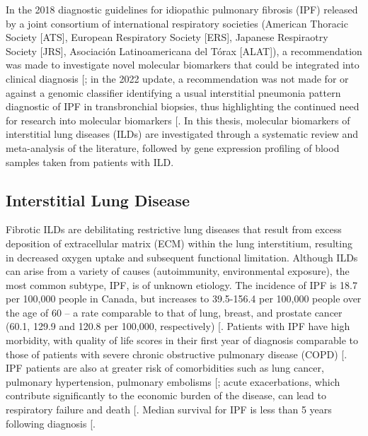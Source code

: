 \documentclass[
]{article}
\begin{document}
In the 2018 diagnostic guidelines for idiopathic pulmonary fibrosis (IPF) released by a joint consortium of international respiratory societies (American Thoracic Society {[}ATS{]}, European Respiratory Society {[}ERS{]}, Japanese Respiraotry Society {[}JRS{]}, Asociación Latinoamericana del Tórax {[}ALAT{]}), a recommendation was made to investigate novel molecular biomarkers that could be integrated into clinical diagnosis {[}\citeproc{ref-raghu_diagnosis_2018}{1}{]}; in the 2022 update, a recommendation was not made for or against a genomic classifier identifying a usual interstitial pneumonia pattern diagnostic of IPF in transbronchial biopsies, thus highlighting the continued need for research into molecular biomarkers {[}\citeproc{ref-raghu_idiopathic_2022}{2}{]}. In this thesis, molecular biomarkers of interstitial lung diseases (ILDs) are investigated through a systematic review and meta-analysis of the literature, followed by gene expression profiling of blood samples taken from patients with ILD.

\subsection{Interstitial Lung Disease}\label{interstitial-lung-disease}

Fibrotic ILDs are debilitating restrictive lung diseases that result from excess deposition of extracellular matrix (ECM) within the lung interstitium, resulting in decreased oxygen uptake and subsequent functional limitation. Although ILDs can arise from a variety of causes (autoimmunity, environmental exposure), the most common subtype, IPF, is of unknown etiology. The incidence of IPF is 18.7 per 100,000 people in Canada, but increases to 39.5-156.4 per 100,000 people over the age of 60 -- a rate comparable to that of lung, breast, and prostate cancer (60.1, 129.9 and 120.8 per 100,000, respectively) {[}\citeproc{ref-canadian_cancer_statistics_advisory_committee_in_collaboration_with_the_canadian_cancer_society_statistics_canada_and_the_public_health_agency_of_canada_canadian_2023}{4}{]}. Patients with IPF have high morbidity, with quality of life scores in their first year of diagnosis comparable to those of patients with severe chronic obstructive pulmonary disease (COPD) {[}\citeproc{ref-hopkins_epidemiology_2016}{3}{]}. IPF patients are also at greater risk of comorbidities such as lung cancer, pulmonary hypertension, pulmonary embolisms {[}\citeproc{ref-raghu_comorbidities_2015}{5}{]}; acute exacerbations, which contribute significantly to the economic burden of the disease, can lead to respiratory failure and death {[}\citeproc{ref-hilberg_economic_2018}{7}{]}. Median survival for IPF is less than 5 years following diagnosis {[}\citeproc{ref-ley_clinical_2011}{8}{]}.
\end{document}
